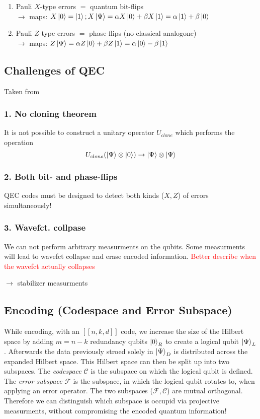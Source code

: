 \begin{enumerate}
    \item Pauli $X$-type errors $=$ quantum bit-flips \\
    $\rightarrow$ maps: $X\ket{0} = \ket{1}; X \ket{\Psi}= \alpha X \ket{0} + \beta X \ket{1} = \alpha  \ket{1} + \beta \ket{0}   $
    \item Pauli $Z$-type errors $=$ phase-flips (no classical analogone)\\
    $\rightarrow$ maps:  $Z \ket{\Psi}= \alpha Z \ket{0} + \beta Z \ket{1} = \alpha  \ket{0} - \beta \ket{1}   $
\end{enumerate}


\subsection{Challenges of QEC}
Taken from \cite{QECintro}
\subsubsection{1. No cloning theorem}
It is not possible to construct a unitary operator $U_{clone}$ which performs the operation
\begin{equation}
    U_{clone}(\ket{\Psi} \otimes \ket{0}) \rightarrow \ket{\Psi} \otimes\ket{\Psi}
\end{equation}

\subsubsection{2. Both bit- and phase-flips}
QEC codes must be designed to detect both kinds ($X,Z$) of errors simultaneously!

\subsubsection{3. Wavefct. collpase}
We can not perform arbitrary measurments on the qubits. 
Some measurments will lead to wavefct collapse and erase encoded information.
\textcolor{red}{Better describe when the wavefct actually collapses}

$\rightarrow$ stabilizer measurments

\subsection{Encoding (Codespace and Error Subspace)}

While encoding, with an $[[n,k,d]]$ code, we increase the size of the Hilbert space by adding $m=n-k$ redundancy qubits $\ket{0}_R$
to create a logical qubit $\ket{\Psi}_L$. 
Afterwards the data previously stroed solely in $\ket{\Psi}_D$ is distributed across the expanded Hilbert space.
This Hilbert space can then be split up into two subspaces. 
The \textit{codespace} $\mathcal{C}$ is the subspace on which the logical qubit is defined.
The \textit{error subspace} $\mathcal{F}$ is the subspace, in which the logical qubit rotates to, when applying an error operator. 
The two subspaces ($\mathcal{F} , \mathcal{C}$) are mutual orthogonal. 
Therefore we can distinguish which subspace is occupid via projective measurments, 
without compromising the encoded quantum information!  \cite{QECintro}


